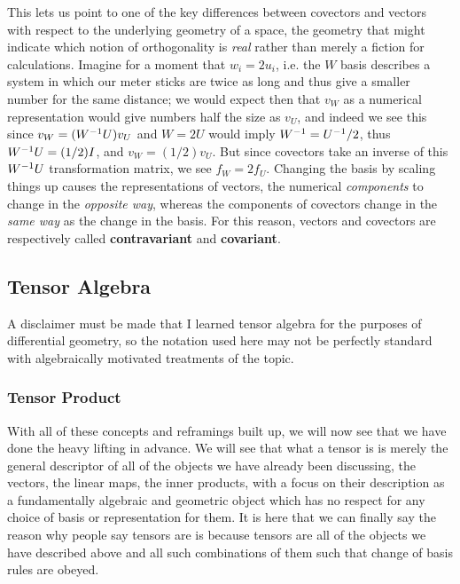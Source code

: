 \documentclass[11pt]{article}
\begin{document}
This lets us point to one of the key differences between covectors and vectors with respect to the underlying geometry of a space, the geometry that might indicate which notion of orthogonality is \emph{real} rather than merely a fiction for calculations. Imagine for a moment that $w_i = 2 u_i$, i.e. the $W$ basis describes a system in which our meter sticks are twice as long and thus give a smaller number for the same distance; we would expect then that $v_W$ as a numerical representation would give numbers half the size as $v_U$, and indeed we see this since $v_W = (W^{-1} U) v_U$ and $W = 2U$ would imply $ W^{-1} = U^{-1}/2$, thus $W^{-1} U = (1/2)I$, and $v_W = (1/2) v_U$. But since covectors take an inverse of this $W^{-1} U$ transformation matrix, we see $f_W = 2 f_U$. Changing the basis by scaling things up causes the representations of vectors, the numerical \emph{components} to change in the \emph{opposite way}, whereas the components of covectors change in the \emph{same way} as the change in the basis. For this reason, vectors and covectors are respectively called \textbf{contravariant} and \textbf{covariant}.

\subsection{Tensor Algebra}

A disclaimer must be made that I learned tensor algebra for the purposes of differential geometry, so the notation used here may not be perfectly standard with algebraically motivated treatments of the topic.

\subsubsection{Tensor Product}

With all of these concepts and reframings built up, we will now see that we have done the heavy lifting in advance. We will see that what a tensor is is merely the general descriptor of all of the objects we have already been discussing, the vectors, the linear maps, the inner products, with a focus on their description as a fundamentally algebraic and geometric object which has no respect for any choice of basis or representation for them. It is here that we can finally say the reason why people say tensors are  is because tensors are all of the objects we have described above and all such combinations of them such that change of basis rules are obeyed.
\end{document}
